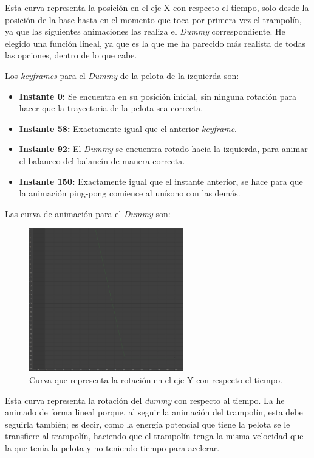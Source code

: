 \documentclass{article}
\begin{document}
Esta curva representa la posición en el eje X con respecto el tiempo, solo desde la posición de la base hasta en el momento que toca por primera vez el trampolín, ya que las siguientes animaciones las realiza el \textit{Dummy} correspondiente. He elegido una función lineal, ya que es la que me ha parecido más realista de todas las opciones, dentro de lo que cabe. 


Los \textit{keyframes} para el \textit{Dummy} de la pelota de la izquierda son:

\begin{itemize}
    \item \textbf{Instante 0: }Se encuentra en su posición inicial, sin ninguna rotación para hacer que la trayectoria de la pelota sea correcta.
    \item \textbf{Instante 58: }Exactamente igual que el anterior \textit{keyframe}.
    \item \textbf{Instante 92: }El \textit{Dummy} se encuentra rotado hacia la izquierda, para animar el balanceo del balancín de manera correcta.
    \item \textbf{Instante 150: }Exactamente igual que el instante anterior, se hace para que la animación ping-pong comience al unísono con las demás.
\end{itemize}

Las curva de animación para el \textit{Dummy} son:

\begin{figure}[H]
    \centering
    \includegraphics[width=0.6\textwidth]{imagenes/curvas/PL/dummy/green.png}
    \caption{Curva que representa la rotación en el eje Y con respecto el tiempo.}
 \end{figure}

Esta curva representa la rotación del \textit{dummy} con respecto al tiempo. La he animado de forma lineal porque, al seguir la animación del trampolín, esta debe seguirla también; es decir, como la energía potencial que tiene la pelota se le transfiere al trampolín, haciendo que el trampolín tenga la misma velocidad que la que tenía la pelota y no teniendo tiempo para acelerar.
\end{document}
